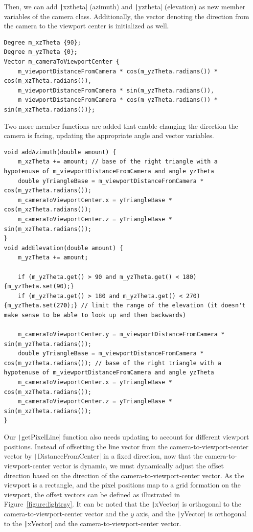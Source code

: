 \documentclass[a4paper]{article}
\newenvironment{code}{\captionsetup{type=listing}}{}
\begin{document}
Then, we can add \texttt|xztheta| (azimuth) and \texttt|yztheta| (elevation) as new member variables of the camera class. Additionally, the vector denoting the direction from the camera to the viewport center is initialized as well.
\begin{code}
\begin{verbatim}
Degree m_xzTheta {90};
Degree m_yzTheta {0};
Vector m_cameraToViewportCenter {
    m_viewportDistanceFromCamera * cos(m_yzTheta.radians()) * cos(m_xzTheta.radians()),
    m_viewportDistanceFromCamera * sin(m_yzTheta.radians()), 
    m_viewportDistanceFromCamera * cos(m_yzTheta.radians()) * sin(m_xzTheta.radians())};
\end{verbatim}
\end{code}
Two more member functions are added that enable changing the direction the camera is facing, updating the appropriate angle and vector variables.
\begin{code}
\begin{verbatim}
void addAzimuth(double amount) {
    m_xzTheta += amount; // base of the right triangle with a hypotenuse of m_viewportDistanceFromCamera and angle yzTheta    
    double yTriangleBase = m_viewportDistanceFromCamera * cos(m_yzTheta.radians());
    m_cameraToViewportCenter.x = yTriangleBase * cos(m_xzTheta.radians());
    m_cameraToViewportCenter.z = yTriangleBase * sin(m_xzTheta.radians());
}
void addElevation(double amount) {
    m_yzTheta += amount;

    if (m_yzTheta.get() > 90 and m_yzTheta.get() < 180) {m_yzTheta.set(90);}
    if (m_yzTheta.get() > 180 and m_yzTheta.get() < 270) {m_yzTheta.set(270);} // limit the range of the elevation (it doesn't make sense to be able to look up and then backwards)

    m_cameraToViewportCenter.y = m_viewportDistanceFromCamera * sin(m_yzTheta.radians());
    double yTriangleBase = m_viewportDistanceFromCamera * cos(m_yzTheta.radians()); // base of the right triangle with a hypotenuse of m_viewportDistanceFromCamera and angle yzTheta
    m_cameraToViewportCenter.x = yTriangleBase * cos(m_xzTheta.radians());
    m_cameraToViewportCenter.z = yTriangleBase * sin(m_xzTheta.radians());
}
\end{verbatim}
\end{code}

Our \texttt|getPixelLine| function also needs updating to account for different viewport positions. Instead of offsetting the line vector from the camera-to-viewport-center vector by  \texttt|DistanceFromCenter| in a fixed direction, now that the camera-to-viewport-center vector is dynamic, we must dynamically adjust the offset direction based on the direction of the camera-to-viewport-center vector. As the viewport is a rectangle, and the pixel positions map to a grid formation on the viewport, the offset vectors can be defined as illustrated in Figure~\ref{figure:lightray}. It can be noted that the \texttt|xVector| is orthogonal to the camera-to-viewport-center vector and the $y$ axis, and the \texttt|yVector| is orthogonal to the \texttt|xVector| and the camera-to-viewport-center vector.
\end{document}
